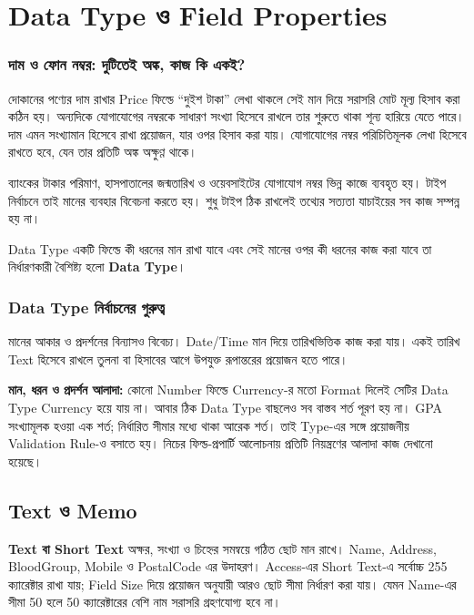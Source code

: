 \section{Data Type ও Field Properties}

\subsubsection{দাম ও ফোন নম্বর: দুটিতেই অঙ্ক, কাজ কি একই?}
দোকানের পণ্যের দাম রাখার Price ফিল্ডে ``দুইশ টাকা'' লেখা থাকলে সেই মান দিয়ে সরাসরি মোট মূল্য হিসাব করা কঠিন হয়।
অন্যদিকে যোগাযোগের নম্বরকে সাধারণ সংখ্যা হিসেবে রাখলে তার শুরুতে থাকা শূন্য হারিয়ে যেতে পারে। দাম এমন
সংখ্যামান হিসেবে রাখা প্রয়োজন, যার ওপর হিসাব করা যায়। যোগাযোগের নম্বর পরিচিতিমূলক লেখা হিসেবে রাখতে হবে,
যেন তার প্রতিটি অঙ্ক অক্ষুণ্ণ থাকে।

ব্যাংকের টাকার পরিমাণ, হাসপাতালের জন্মতারিখ ও ওয়েবসাইটের যোগাযোগ নম্বর ভিন্ন কাজে ব্যবহৃত হয়। টাইপ নির্বাচনে তাই মানের ব্যবহার বিবেচনা করতে হয়। শুধু টাইপ ঠিক রাখলেই তথ্যের সত্যতা যাচাইয়ের সব কাজ সম্পন্ন হয় না।

\begin{definitionbox}{Data Type}
একটি ফিল্ডে কী ধরনের মান রাখা যাবে এবং সেই মানের ওপর কী ধরনের কাজ করা যাবে তা নির্ধারণকারী বৈশিষ্ট্য হলো \textbf{Data Type}।
\end{definitionbox}


\subsubsection{Data Type নির্বাচনের গুরুত্ব}
মানের আকার ও প্রদর্শনের বিন্যাসও বিবেচ্য। Date/Time মান দিয়ে তারিখভিত্তিক কাজ করা যায়। একই তারিখ Text হিসেবে রাখলে তুলনা বা হিসাবের আগে উপযুক্ত রূপান্তরের প্রয়োজন হতে পারে।

\textbf{মান, ধরন ও প্রদর্শন আলাদা:} কোনো Number ফিল্ডে Currency-র মতো Format দিলেই সেটির Data Type Currency হয়ে যায় না। আবার ঠিক Data Type বাছলেও সব বাস্তব শর্ত পূরণ হয় না। GPA সংখ্যামূলক হওয়া এক শর্ত; নির্ধারিত সীমার মধ্যে থাকা আরেক শর্ত। তাই Type-এর সঙ্গে প্রয়োজনীয় Validation Rule-ও বসাতে হয়। নিচের ফিল্ড-প্রপার্টি আলোচনায় প্রতিটি নিয়ন্ত্রণের আলাদা কাজ দেখানো হয়েছে।


\subsection{Text ও Memo}
\textbf{Text বা Short Text} অক্ষর, সংখ্যা ও চিহ্নের সমন্বয়ে গঠিত ছোট মান রাখে। Name, Address, BloodGroup, Mobile ও PostalCode এর উদাহরণ। Access-এর Short Text-এ সর্বোচ্চ 255 ক্যারেক্টার রাখা যায়; Field Size দিয়ে প্রয়োজন অনুযায়ী আরও ছোট সীমা নির্ধারণ করা যায়। যেমন Name-এর সীমা 50 হলে 50 ক্যারেক্টারের বেশি নাম সরাসরি গ্রহণযোগ্য হবে না।


